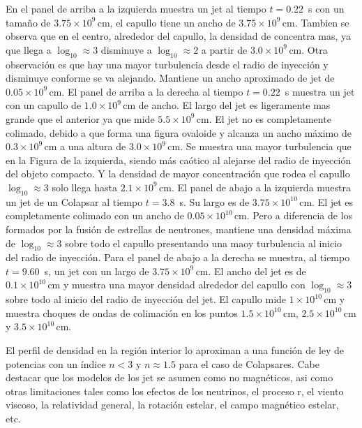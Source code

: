\documentclass[12pt,a4paper]{book}
\begin{document}
{\color{blue} En el panel de arriba a la izquierda muestra un jet al tiempo $t = 0.22$~s con un tamaño de $3.75 \times 10^9 \, \text{cm}$, el capullo tiene un ancho de $3.75 \times 10^9 \, \text{cm}$. 
Tambien se observa que en el centro, alrededor del capullo, la densidad de concentra mas, ya que llega a $\log_{10} \approx 3$ disminuye a $\log_{10} \approx 2$ a partir de $3.0 \times 10^9 \, \text{cm}$. 
Otra observación es que hay una mayor turbulencia desde el radio de inyección y disminuye conforme se va alejando. Mantiene un ancho aproximado de jet de $0.05 \times 10^9 \, \text{cm}$. 
El panel de arriba a la derecha al tiempo $t = 0.22$~s muestra un jet con un capullo de $1.0 \times 10^9 \, \text{cm}$ de ancho. El largo del jet es ligeramente mas grande que el anterior ya que 
mide $5.5 \times 10^9 \, \text{cm}$. El jet no es completamente colimado, debido a que forma una figura ovaloide y alcanza un ancho máximo de $0.3 \times 10^9 \, \text{cm}$ a una altura de $3.0 \times 10^9 \, \text{cm}$. 
Se muestra una mayor turbulencia que en la Figura de la izquierda, siendo más caótico al alejarse del radio de inyección del objeto compacto. Y la densidad de mayor concentración que 
rodea el capullo $\log_{10} \approx 3$ solo llega hasta $2.1 \times 10^9 \, \text{cm}$.
El panel de abajo a la izquierda muestra un jet de un Colapsar al tiempo $t = 3.8$~s. Su largo es de $3.75 \times 10^{10} \, \text{cm}$. El jet es completamente colimado con un ancho de $0.05 \times 10^{10} \, \text{cm}$. 
Pero a diferencia de los formados por la fusión de estrellas de neutrones, mantiene una densidad máxima de $\log_{10} \approx 3$ sobre todo el capullo presentando una maoy turbulencia al inicio del radio de
inyección.
Para el panel de abajo a la derecha se muestra, al tiempo $t = 9.60$~s, un jet con un largo de $3.75 \times 10^9 \, \text{cm}$. El ancho del jet es de $0.1 \times 10^{10} \, \text{cm}$ y muestra una mayor densidad alrededor
del capullo con $\log_{10} \approx 3$ sobre todo al inicio del radio de inyección del jet. El capullo mide $1 \times 10^{10} \, \text{cm}$ y muestra choques de ondas de colimación en los puntos
$1.5 \times 10^{10} \, \text{cm}$, $2.5 \times 10^{10} \, \text{cm}$ y $3.5 \times 10^{10} \, \text{cm}$.}

El perfil de densidad en la región interior lo aproximan a una función de ley de potencias con un índice $n<3$ y $n \approx 1.5$ para el caso de Colapsares. Cabe destacar 
que los modelos de los jet se asumen como no magnéticos, asi como otras limitaciones tales como los efectos de los neutrinos, el proceso r, el viento viscoso, la relatividad general, 
la rotación estelar, el campo magnético estelar, etc.
\end{document}
